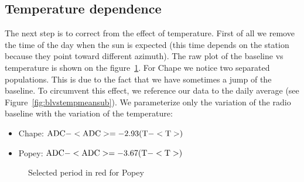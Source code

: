 \newpage
\subsection{Temperature dependence}
\label{sec:tempdep}  
The next step  is to correct from the effect  of temperature. First of
all we remove the time of the  day when the sun is expected (this time
depends on  the station because they point  toward different azimuth).
The  raw  plot  of  the  baseline  vs  temperature  is  shown  on  the
figure~\ref{fig:blvstempraw}.   For  Chape  we  notice  two  separated
populations. This is due to the  fact that we have sometimes a jump of
the baseline. To circumvent this  effect, we reference our data to the
daily average (see Figure~\ref{fig:blvstempmeansub}).  We parameterize
only the  variation of  the radio baseline  with the variation  of the
temperature:
\begin{itemize}
\item Chape: $\rm ADC - <ADC> = -2.93 (T - <T>) $
\item Popey: $\rm ADC - <ADC> = -3.67 (T - <T>) $ 
\end{itemize}


\begin{figure}[!ht]
  \centering
  \hspace*{-3ex}
  \caption{Selected period in red for Popey}
 \label{fig:blvstempraw}
\end{figure}


